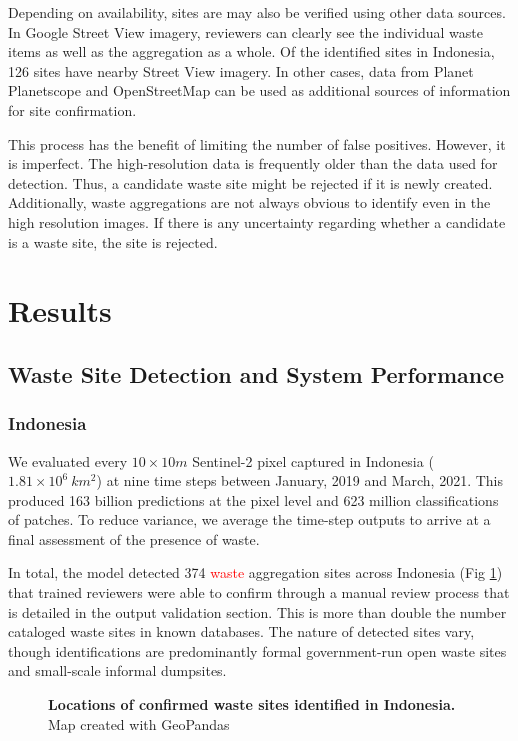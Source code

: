 \documentclass[10pt,letterpaper]{article}
\begin{document}
Depending on availability, sites are may also be verified using other data sources. In Google Street View imagery, reviewers can clearly see the individual waste items as well as the aggregation as a whole. Of the identified sites in Indonesia, 126 sites have nearby Street View imagery. In other cases, data from Planet Planetscope and OpenStreetMap can be used as additional sources of information for site confirmation.

This process has the benefit of limiting the number of false positives. However, it is imperfect. The high-resolution data is frequently older than the data used for detection. Thus, a candidate waste site might be rejected if it is newly created. Additionally, waste aggregations are not always obvious to identify even in the high resolution images. If there is any uncertainty regarding whether a candidate is a waste site, the site is rejected.

\section*{Results}
\label{sec:results}
\subsection*{Waste Site Detection and System Performance}
\subsubsection*{Indonesia}
We evaluated every $10\times10 m$ Sentinel-2 pixel captured in Indonesia ($1.81\times10^6\:km^2$) at nine time steps between January, 2019 and March, 2021. This produced 163 billion predictions at the pixel level and 623 million classifications of patches. To reduce variance, we average the time-step outputs to arrive at a final assessment of the presence of waste.

In total, the model detected 374 \textcolor{red}{waste} aggregation sites across Indonesia (Fig \ref{fig:indonesia_locations}) that trained reviewers were able to confirm through a manual review process that is detailed in the output validation section. This is more than double the number cataloged waste sites in known databases. The nature of detected sites vary, though identifications are predominantly formal government-run open waste sites and small-scale informal dumpsites.

\begin{figure}[!h]
    \caption{{\bf Locations of confirmed waste sites identified in Indonesia.}
    Map created with GeoPandas \cite{kelsey_jordahl_2020_3946761} \color{red}{with country boundary from provided by the Database of Global Administrative Areas.}}
    \label{fig:indonesia_locations}
\end{figure}
\end{document}
